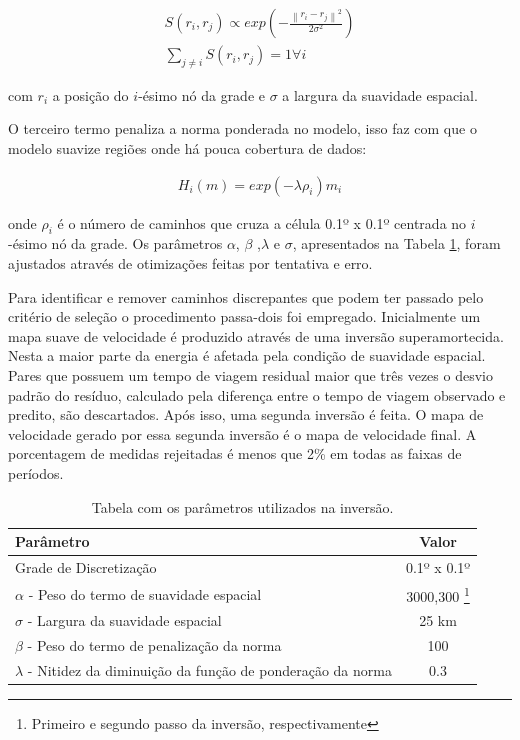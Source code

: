 \begin{eqnarray}
S(r_{i},r_{j}) \propto exp(- \frac{\left \| r_{i}-r_{j}  \right \|^{2}}{2\sigma ^{2}}) \\
\sum_{j\neq i} S(r_{i},r_{j}) = 1         \forall i 
\end{eqnarray}

com $r_{i}$ a posição do $i$-ésimo nó da grade e $\sigma$ a largura da suavidade espacial.

O terceiro termo penaliza a norma ponderada no modelo, isso faz com que o modelo suavize regiões onde há pouca cobertura de dados:

\begin{eqnarray}
H_{i}(m) = exp(-\lambda \rho _{i})m_{i}
\end{eqnarray}

onde $\rho _{i}$ é o número de caminhos que cruza a célula 0.1º x 0.1º centrada no $i$-ésimo nó da grade. Os parâmetros $\alpha$, $\beta$ ,$\lambda$ e $\sigma$, apresentados na Tabela \ref{tabelaPARAMETROS}, foram ajustados através de otimizações feitas por tentativa e erro.

Para identificar e remover caminhos discrepantes que podem ter passado pelo critério de seleção o procedimento passa-dois foi empregado. Inicialmente um mapa suave de velocidade é produzido através de uma inversão superamortecida. Nesta a maior parte da energia é afetada pela condição de suavidade espacial. Pares que possuem um tempo de viagem residual maior que três vezes o desvio padrão do resíduo, calculado pela diferença entre o tempo de viagem observado e predito,  são descartados. Após isso, uma segunda inversão é feita. O mapa de velocidade gerado por essa segunda inversão é o mapa de velocidade final. A porcentagem de medidas rejeitadas é menos que 2\% em todas as faixas de períodos.

\begin{savenotes}
\begin{table}[!ht]
\begin{center}
\small
\caption{Tabela com os parâmetros utilizados na inversão.}
\begin{tabular}{ l c }
\hline
{\textbf{Parâmetro}} & {\textbf{Valor}}\\
\hline
Grade de Discretização & 0.1º x 0.1º\\
$\alpha$ - Peso do termo de suavidade espacial & 3000,300 \footnote{Primeiro e segundo passo da inversão, respectivamente}
\\
$\sigma$ - Largura da suavidade espacial & 25 km\\
$\beta$ - Peso do termo de penalização da norma & 100\\
$\lambda$ - Nitidez da diminuição da função de ponderação da norma & 0.3\\
\hline
\end{tabular}
\label{tabelaPARAMETROS}
\end{center}
\end{table}
\end{savenotes}

